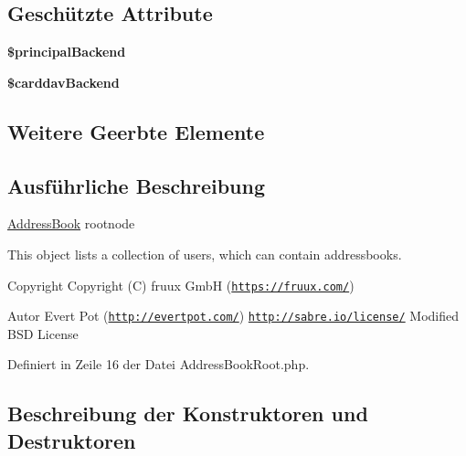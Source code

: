 \subsection*{Geschützte Attribute}
\begin{DoxyCompactItemize}
\item 
\mbox{\label{class_sabre_1_1_card_d_a_v_1_1_address_book_root_aea488b22e8e8f6f804f3a442a16f8710}} 
{\bfseries \$principal\+Backend}
\item 
\mbox{\label{class_sabre_1_1_card_d_a_v_1_1_address_book_root_a6ac16ea46b900100558a9276a2d443ba}} 
{\bfseries \$carddav\+Backend}
\end{DoxyCompactItemize}
\subsection*{Weitere Geerbte Elemente}


\subsection{Ausführliche Beschreibung}
\mbox{\hyperlink{class_sabre_1_1_card_d_a_v_1_1_address_book}{Address\+Book}} rootnode

This object lists a collection of users, which can contain addressbooks.

\begin{DoxyCopyright}{Copyright}
Copyright (C) fruux GmbH (\href{https://fruux.com/}{\tt https\+://fruux.\+com/}) 
\end{DoxyCopyright}
\begin{DoxyAuthor}{Autor}
Evert Pot (\href{http://evertpot.com/}{\tt http\+://evertpot.\+com/})  \href{http://sabre.io/license/}{\tt http\+://sabre.\+io/license/} Modified B\+SD License 
\end{DoxyAuthor}


Definiert in Zeile 16 der Datei Address\+Book\+Root.\+php.



\subsection{Beschreibung der Konstruktoren und Destruktoren}
\mbox{\label{class_sabre_1_1_card_d_a_v_1_1_address_book_root_adec87a327a988a236419d6a8aa16f136}} 
